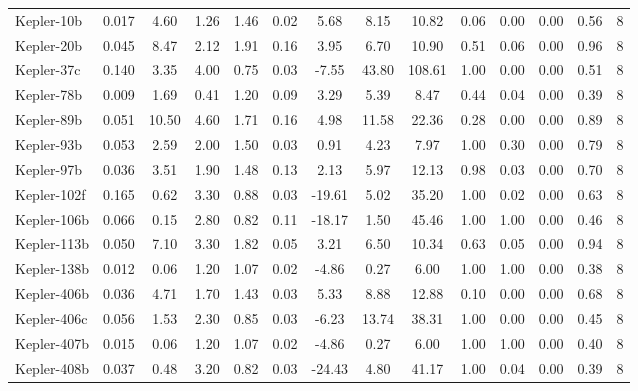 \documentclass[]{emulateapj}
\begin{document}
\begin{table*}[h]
\begin{center}
{\begin{tabular}{lcccccccc|ccc|cc}
 Kepler-10b   &   0.017 &    4.60 &    1.26 &    1.46 &    0.02 &    5.68 &    8.15 &   10.82 &    0.06 &    0.00 &    0.00 &    0.56 &     8\\
 Kepler-20b   &   0.045 &    8.47 &    2.12 &    1.91 &    0.16 &    3.95 &    6.70 &   10.90 &    0.51 &    0.06 &    0.00 &    0.96 &     8\\
 Kepler-37c   &   0.140 &    3.35 &    4.00 &    0.75 &    0.03 &   -7.55 &   43.80 &  108.61 &    1.00 &    0.00 &    0.00 &    0.51 &     8\\
 Kepler-78b   &   0.009 &    1.69 &    0.41 &    1.20 &    0.09 &    3.29 &    5.39 &    8.47 &    0.44 &    0.04 &    0.00 &    0.39 &     8\\
 Kepler-89b   &   0.051 &   10.50 &    4.60 &    1.71 &    0.16 &    4.98 &   11.58 &   22.36 &    0.28 &    0.00 &    0.00 &    0.89 &     8\\
 Kepler-93b   &   0.053 &    2.59 &    2.00 &    1.50 &    0.03 &    0.91 &    4.23 &    7.97 &    1.00 &    0.30 &    0.00 &    0.79 &     8\\
 Kepler-97b   &   0.036 &    3.51 &    1.90 &    1.48 &    0.13 &    2.13 &    5.97 &   12.13 &    0.98 &    0.03 &    0.00 &    0.70 &     8\\
 Kepler-102f  &   0.165 &    0.62 &    3.30 &    0.88 &    0.03 &  -19.61 &    5.02 &   35.20 &    1.00 &    0.02 &    0.00 &    0.63 &     8\\
 Kepler-106b  &   0.066 &    0.15 &    2.80 &    0.82 &    0.11 &  -18.17 &    1.50 &   45.46 &    1.00 &    1.00 &    0.00 &    0.46 &     8\\
 Kepler-113b  &   0.050 &    7.10 &    3.30 &    1.82 &    0.05 &    3.21 &    6.50 &   10.34 &    0.63 &    0.05 &    0.00 &    0.94 &     8\\
 Kepler-138b  &   0.012 &    0.06 &    1.20 &    1.07 &    0.02 &   -4.86 &    0.27 &    6.00 &    1.00 &    1.00 &    0.00 &    0.38 &     8\\
 Kepler-406b  &   0.036 &    4.71 &    1.70 &    1.43 &    0.03 &    5.33 &    8.88 &   12.88 &    0.10 &    0.00 &    0.00 &    0.68 &     8\\
 Kepler-406c  &   0.056 &    1.53 &    2.30 &    0.85 &    0.03 &   -6.23 &   13.74 &   38.31 &    1.00 &    0.00 &    0.00 &    0.45 &     8\\
 Kepler-407b  &   0.015 &    0.06 &    1.20 &    1.07 &    0.02 &   -4.86 &    0.27 &    6.00 &    1.00 &    1.00 &    0.00 &    0.40 &     8\\
 Kepler-408b  &   0.037 &    0.48 &    3.20 &    0.82 &    0.03 &  -24.43 &    4.80 &   41.17 &    1.00 &    0.04 &    0.00 &    0.39 &     8\\

\end{tabular}}
\end{center}
\end{table*}
\end{document}
